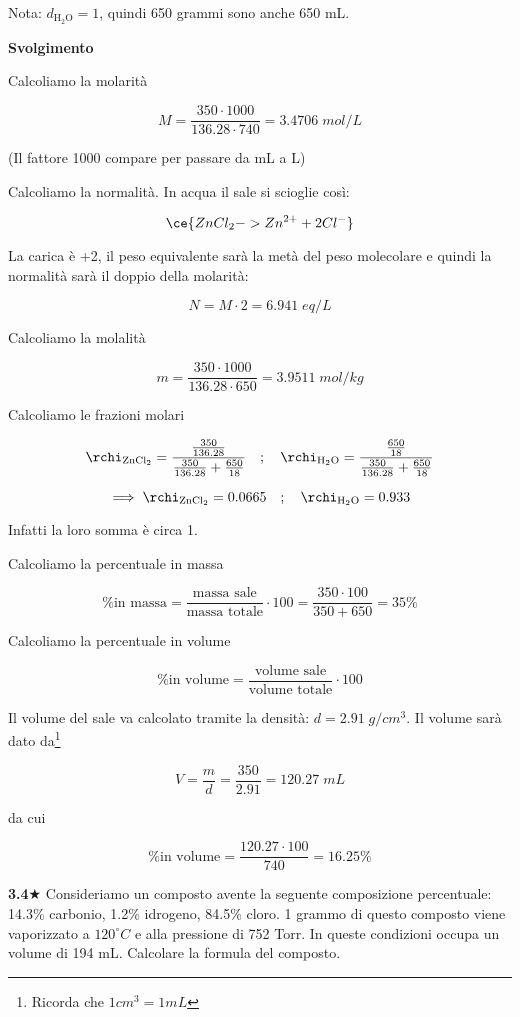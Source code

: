 \vspace{0.2cm}Nota: $d_{\text{H}_2\text{O}}=1$, quindi 650 grammi sono anche 650 mL.

\vspace{0.2cm}\large\textbf{Svolgimento}\normalsize

\vspace{0.2cm}Calcoliamo la molarità

$$M=\frac{350 \cdot 1000}{136.28 \cdot 740}=3.4706\;mol/L$$

(Il fattore 1000 compare per passare da mL a L)

Calcoliamo la normalità. In acqua il sale si scioglie così:

$$\ce{ZnCl_2 -> Zn^{2+} + 2Cl^-}$$

La carica è +2, il peso equivalente sarà la metà del peso molecolare e quindi la normalità sarà il doppio della molarità:

$$N=M \cdot 2=6.941\;eq/L$$

Calcoliamo la molalità

$$m=\frac{350 \cdot 1000}{136.28 \cdot 650}=3.9511\;mol/kg$$

Calcoliamo le frazioni molari

$$\rchi_{\rm ZnCl_2}=\frac{\frac{350}{136.28}}{\frac{350}{136.28} + \frac{650}{18}}
\quad;\quad
\rchi_{\rm H_2O}=\frac{\frac{650}{18}}{\frac{350}{136.28} + \frac{650}{18}}$$

$$\implies
\rchi_{\rm ZnCl_2}=0.0665
\quad;\quad
\rchi_{\rm H_2O}=0.933
$$

Infatti la loro somma è circa 1.

Calcoliamo la percentuale in massa

$$\text{\% in massa}
=\frac{\text{massa sale}}{\text{massa totale}} \cdot 100
=\frac{350 \cdot 100}{350 + 650}=35\%$$

Calcoliamo la percentuale in volume

$$\text{\% in volume}
=\frac{\text{volume sale}}{\text{volume totale}} \cdot 100$$

Il volume del sale va calcolato tramite la densità: $d=2.91\;g/cm^3$. Il volume sarà dato da\footnote{Ricorda che $1 cm^3 = 1 mL$}

$$V=\frac{m}{d}=\frac{350}{2.91}=120.27\;mL$$

da cui 

$$\text{\% in volume}
=\frac{120.27 \cdot 100}{740}=16.25\%$$

\vspace{0.2cm}\textbf{3.4}$\bigstar$ Consideriamo un composto avente la seguente composizione percentuale: 14.3\% carbonio, 1.2\% idrogeno, 84.5\% cloro. 1 grammo di questo composto viene vaporizzato a $120^{\circ}C$ e alla pressione di 752 Torr. In queste condizioni occupa un volume di 194 mL. Calcolare la formula del composto.

